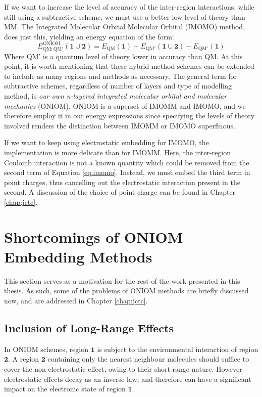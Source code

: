 If we want to increase the level of accuracy of the inter-region interactions, while still using a subtractive scheme, we must use a better low level of theory than MM. The Integrated Molecular Orbital Molecular Orbital (IMOMO) method, does just this, yielding an energy equation of the form:\cite{Humbel1996}
\begin{equation}
    E^{\text{ONIOM}}_{\text{QM}:\text{QM}'}(\bm{1} \cup \bm{2}) = E_{\text{QM}}(\bm{1}) + E_{\text{QM}'}(\bm{1} \cup \bm{2}) - E_{\text{QM}'}(\bm{1})
    \label{eq:imomo}
\end{equation}
Where QM' is a quantum level of theory lower in accuracy than QM. At this point, it is worth mentioning that these hybrid method schemes can be extended to include as many regions and methods as necessary. The general term for subtractive schemes, regardless of number of layers and type of modelling method, is \textit{our own n-layered integrated molecular orbital and molecular mechanics} (ONIOM).\cite{Svensson1996} ONIOM is a superset of IMOMM and IMOMO, and we therefore employ it in our energy expressions since specifying the levels of theory involved renders the distinction between IMOMM or IMOMO superfluous.

If we want to keep using electrostatic embedding for IMOMO, the implementation is more delicate than for IMOMM. Here, the inter-region Coulomb interaction is not a known quantity which could be removed from the second term of Equation \ref{eq:imomo}. Instead, we must embed the third term in point charges, thus cancelling out the electrostatic interaction present in the second. A discussion of the choice of point charge can be found in Chapter \ref{chap:jctc}.

\section{Shortcomings of ONIOM Embedding Methods}
\label{sec:problems}
This section serves as a motivation for the rest of the work presented in this thesis. As such, some of the problems of ONIOM methods are briefly discussed now, and are addressed in Chapter \ref{chap:jctc}.

\subsection{Inclusion of Long-Range Effects}
\label{sec:prob_lr}
In ONIOM schemes, region $\bm{1}$ is subject to the environmental interaction of region $\bm{2}$. A region $\bm{2}$ containing only the nearest neighbour molecules should suffice to cover the non-electrostatic effect, owing to their short-range nature.\cite{Fornari2017} However electrostatic effects decay as an inverse law, and therefore can have a significant impact on the electronic state of region $\bm{1}$.

